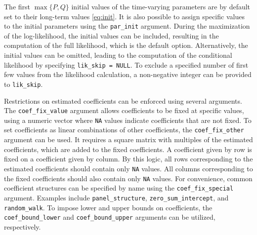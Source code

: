 The first \(\max \{ P, Q \}\) initial values of the time-varying parameters are by default set to their long-term values \eqref{eq:init}. It is also possible to assign specific values to the initial parameters using the \texttt{par\_init} argument. During the maximization of the log-likelihood, the initial values can be included, resulting in the computation of the full likelihood, which is the default option. Alternatively, the initial values can be omitted, leading to the computation of the conditional likelihood by specifying \texttt{lik\_skip\ =\ NULL}. To exclude a specified number of first few values from the likelihood calculation, a non-negative integer can be provided to \texttt{lik\_skip}.

Restrictions on estimated coefficients can be enforced using several arguments. The \texttt{coef\_fix\_value} argument allows coefficients to be fixed at specific values, using a numeric vector where \texttt{NA} values indicate coefficients that are not fixed. To set coefficients as linear combinations of other coefficients, the \texttt{coef\_fix\_other} argument can be used. It requires a square matrix with multiples of the estimated coefficients, which are added to the fixed coefficients. A coefficient given by row is fixed on a coefficient given by column. By this logic, all rows corresponding to the estimated coefficients should contain only \texttt{NA} values. All columns corresponding to the fixed coefficients should also contain only \texttt{NA} values. For convenience, common coefficient structures can be specified by name using the \texttt{coef\_fix\_special} argument. Examples include \texttt{panel\_structure}, \texttt{zero\_sum\_intercept}, and \texttt{random\_walk}. To impose lower and upper bounds on coefficients, the \texttt{coef\_bound\_lower} and \texttt{coef\_bound\_upper} arguments can be utilized, respectively.

